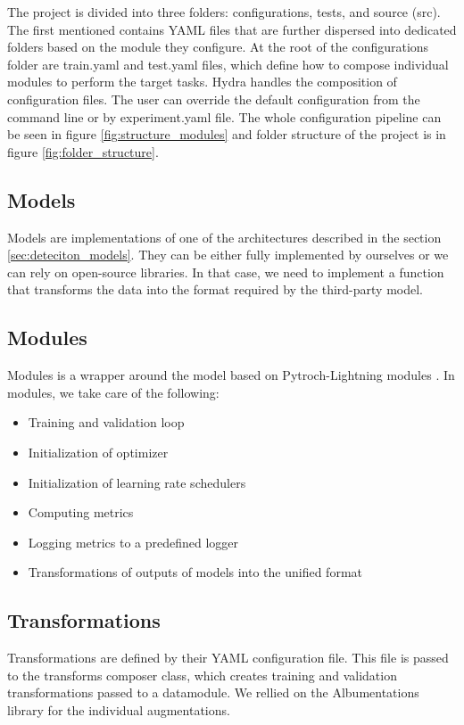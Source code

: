 The project is divided into three folders: configurations, tests, and source (src). The first mentioned contains YAML files that are further dispersed into dedicated folders based on the module they configure. At the root of the configurations folder are train.yaml and test.yaml files, which define how to compose individual modules to perform the target tasks. Hydra \cite{Yadan2019Hydra} handles the composition of configuration files. The user can override the default configuration from the command line or by experiment.yaml file. The whole configuration pipeline can be seen in figure \ref{fig:structure_modules} and folder structure of the project is in figure \ref{fig:folder_structure}.



\subsection{Models}
Models are implementations of one of the architectures described in the section \ref{sec:deteciton_models}. They can be either fully implemented by ourselves or we can rely on open-source libraries. In that case, we need to implement a function that transforms the data into the format required by the third-party model.

\subsection{Modules}
Modules is a wrapper around the model based on Pytroch-Lightning modules \cite{falcon2019pytorch}. In modules, we take care of the following:
\begin{itemize}
    \item Training and validation loop
    \item Initialization of optimizer
    \item Initialization of learning rate schedulers
    \item Computing metrics
    \item Logging metrics to a predefined logger
    \item Transformations of outputs of models into the unified format
\end{itemize}


\subsection{Transformations}
Transformations are defined by their YAML configuration file. This file is passed to the transforms composer class, which creates training and validation transformations passed to a datamodule. We rellied on the Albumentations library for the individual augmentations.

